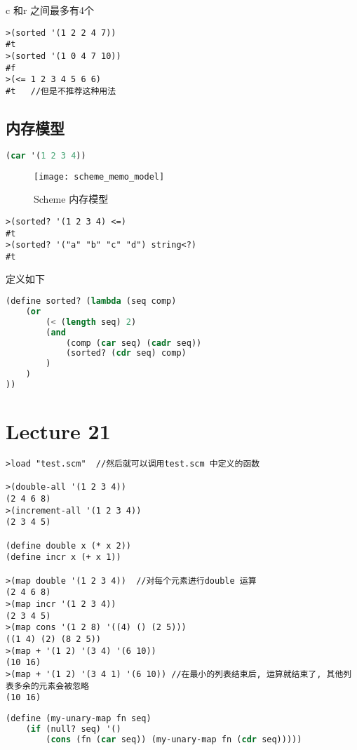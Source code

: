 \documentclass{article}
\begin{document}
c 和r 之间最多有4个

\begin{verbatim}
>(sorted '(1 2 2 4 7))
#t
>(sorted '(1 0 4 7 10))
#f
>(<= 1 2 3 4 5 6 6)
#t   //但是不推荐这种用法
\end{verbatim}

\subsection{内存模型}
\begin{lstlisting}[language = Lisp]
(car '(1 2 3 4))
\end{lstlisting}
\begin{figure}[htbp]
	\centering
	\texttt{[image: scheme\_memo\_model]}\\
	\caption{Scheme 内存模型}\label{fig.scheme.memo.model}
\end{figure}

\begin{verbatim}
>(sorted? '(1 2 3 4) <=)
#t
>(sorted? '("a" "b" "c" "d") string<?)
#t
\end{verbatim}
定义如下
\begin{lstlisting}[language = Lisp]
(define sorted? (lambda (seq comp)
	(or
		(< (length seq) 2)
		(and
			(comp (car seq) (cadr seq))
			(sorted? (cdr seq) comp)
		)
	)
))
\end{lstlisting}

\section{Lecture 21}
\begin{verbatim}
>load "test.scm"  //然后就可以调用test.scm 中定义的函数

>(double-all '(1 2 3 4))
(2 4 6 8)
>(increment-all '(1 2 3 4))
(2 3 4 5)

(define double x (* x 2))
(define incr x (+ x 1))

>(map double '(1 2 3 4))  //对每个元素进行double 运算
(2 4 6 8)
>(map incr '(1 2 3 4))
(2 3 4 5)
>(map cons '(1 2 8) '((4) () (2 5)))
((1 4) (2) (8 2 5))
>(map + '(1 2) '(3 4) '(6 10))
(10 16)
>(map + '(1 2) '(3 4 1) '(6 10)) //在最小的列表结束后, 运算就结束了, 其他列表多余的元素会被忽略
(10 16)
\end{verbatim}

\begin{lstlisting}[language = Lisp]
(define (my-unary-map fn seq)
	(if (null? seq) '()
		(cons (fn (car seq)) (my-unary-map fn (cdr seq)))))
\end{lstlisting}
\end{document}
